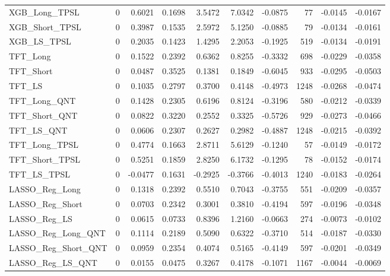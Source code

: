 \begin{tabular}{llrrrrrrrr}
\cline{1-10}
XGB\_Long\_TPSL & 0 & 0.6021 & 0.1698 & 3.5472 & 7.0342 & -0.0875 & 77 & -0.0145 & -0.0167 \\
\cline{1-10}
XGB\_Short\_TPSL & 0 & 0.3987 & 0.1535 & 2.5972 & 5.1250 & -0.0885 & 79 & -0.0134 & -0.0161 \\
\cline{1-10}
XGB\_LS\_TPSL & 0 & 0.2035 & 0.1423 & 1.4295 & 2.2053 & -0.1925 & 519 & -0.0134 & -0.0191 \\
\cline{1-10}
TFT\_Long & 0 & 0.1522 & 0.2392 & 0.6362 & 0.8255 & -0.3332 & 698 & -0.0229 & -0.0358 \\
\cline{1-10}
TFT\_Short & 0 & 0.0487 & 0.3525 & 0.1381 & 0.1849 & -0.6045 & 933 & -0.0295 & -0.0503 \\
\cline{1-10}
TFT\_LS & 0 & 0.1035 & 0.2797 & 0.3700 & 0.4148 & -0.4973 & 1248 & -0.0268 & -0.0474 \\
\cline{1-10}
TFT\_Long\_QNT & 0 & 0.1428 & 0.2305 & 0.6196 & 0.8124 & -0.3196 & 580 & -0.0212 & -0.0339 \\
\cline{1-10}
TFT\_Short\_QNT & 0 & 0.0822 & 0.3220 & 0.2552 & 0.3325 & -0.5726 & 929 & -0.0273 & -0.0466 \\
\cline{1-10}
TFT\_LS\_QNT & 0 & 0.0606 & 0.2307 & 0.2627 & 0.2982 & -0.4887 & 1248 & -0.0215 & -0.0392 \\
\cline{1-10}
TFT\_Long\_TPSL & 0 & 0.4774 & 0.1663 & 2.8711 & 5.6129 & -0.1240 & 57 & -0.0149 & -0.0172 \\
\cline{1-10}
TFT\_Short\_TPSL & 0 & 0.5251 & 0.1859 & 2.8250 & 6.1732 & -0.1295 & 78 & -0.0152 & -0.0174 \\
\cline{1-10}
TFT\_LS\_TPSL & 0 & -0.0477 & 0.1631 & -0.2925 & -0.3766 & -0.4013 & 1240 & -0.0183 & -0.0264 \\
\cline{1-10}
LASSO\_Reg\_Long & 0 & 0.1318 & 0.2392 & 0.5510 & 0.7043 & -0.3755 & 551 & -0.0209 & -0.0357 \\
\cline{1-10}
LASSO\_Reg\_Short & 0 & 0.0703 & 0.2342 & 0.3001 & 0.3810 & -0.4194 & 597 & -0.0196 & -0.0348 \\
\cline{1-10}
LASSO\_Reg\_LS & 0 & 0.0615 & 0.0733 & 0.8396 & 1.2160 & -0.0663 & 274 & -0.0073 & -0.0102 \\
\cline{1-10}
LASSO\_Reg\_Long\_QNT & 0 & 0.1114 & 0.2189 & 0.5090 & 0.6322 & -0.3710 & 514 & -0.0187 & -0.0330 \\
\cline{1-10}
LASSO\_Reg\_Short\_QNT & 0 & 0.0959 & 0.2354 & 0.4074 & 0.5165 & -0.4149 & 597 & -0.0201 & -0.0349 \\
\cline{1-10}
LASSO\_Reg\_LS\_QNT & 0 & 0.0155 & 0.0475 & 0.3267 & 0.4178 & -0.1071 & 1167 & -0.0044 & -0.0069 \\

\end{tabular}
